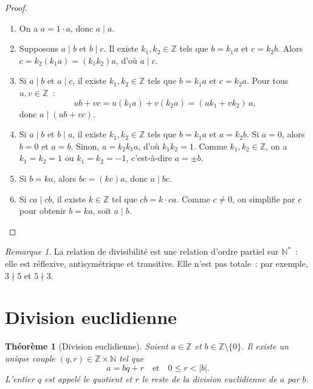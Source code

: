 \documentclass[12pt,a4paper,openany]{book}
\theoremstyle{definition}
\theoremstyle{plain}
\newtheorem{theoreme}[definition]{Théorème}
\theoremstyle{remark}
\newtheorem{remarque}[definition]{Remarque}
\newcommand{\N}{\mathbb{N}}
\newcommand{\Z}{\mathbb{Z}}
\newcommand{\abs}[1]{\left|#1\right|}
\begin{document}
\begin{proof}
\begin{enumerate}[label=(\roman*)]
  \item On a $a = 1 \cdot a$, donc $a \mid a$.

  \item Supposons $a \mid b$ et $b \mid c$. Il existe $k_1, k_2 \in \Z$ tels que
    $b = k_1 a$ et $c = k_2 b$. Alors $c = k_2 (k_1 a) = (k_1 k_2) a$, d'où
    $a \mid c$.

  \item Si $a \mid b$ et $a \mid c$, il existe $k_1, k_2 \in \Z$ tels que
    $b = k_1 a$ et $c = k_2 a$. Pour tous $u, v \in \Z$~:
    \[
      ub + vc = u(k_1 a) + v(k_2 a) = (uk_1 + vk_2)\, a,
    \]
    donc $a \mid (ub + vc)$.

  \item Si $a \mid b$ et $b \mid a$, il existe $k_1, k_2 \in \Z$ tels que
    $b = k_1 a$ et $a = k_2 b$. Si $a = 0$, alors $b = 0$ et $a = b$. Sinon,
    $a = k_2 k_1 a$, d'où $k_1 k_2 = 1$. Comme $k_1, k_2 \in \Z$, on a
    $k_1 = k_2 = 1$ ou $k_1 = k_2 = -1$, c'est-à-dire $a = \pm b$.

  \item Si $b = ka$, alors $bc = (kc)a$, donc $a \mid bc$.

  \item Si $ca \mid cb$, il existe $k \in \Z$ tel que $cb = k \cdot ca$. Comme
    $c \neq 0$, on simplifie par $c$ pour obtenir $b = ka$, soit $a \mid b$.
    \qedhere
\end{enumerate}
\end{proof}

\begin{remarque}
\label{rem:div:ordre}
La relation de divisibilité est une relation d'ordre partiel sur $\N^*$~: elle est
réflexive, antisymétrique et transitive. Elle n'est pas totale~: par exemple,
$3 \nmid 5$ et $5 \nmid 3$.
\end{remarque}

\section{Division euclidienne}
\label{sec:ch1:div_eucl}


\begin{theoreme}[Division euclidienne]
\label{thm:div_eucl}
Soient $a \in \Z$ et $b \in \Z \setminus \{0\}$. Il existe un unique couple
$(q, r) \in \Z \times \N$ tel que
\[
  a = bq + r \quad \text{et} \quad 0 \leq r < \abs{b}.
\]
L'entier $q$ est appelé le \emph{quotient} et $r$ le
\emph{reste} de la division euclidienne de $a$ par $b$.
\end{theoreme}
\end{document}
